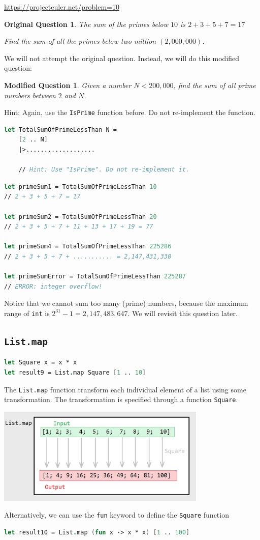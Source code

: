 \documentclass[12pt]{article}
\newtheorem*{modQuestion*}{Modified Question}
\newtheorem*{origQuestion*}{Original Question}
\begin{document}
\url{https://projecteuler.net/problem=10}

\begin{origQuestion*}
The sum of the primes below $10$ is $2 + 3 + 5 + 7 = 17$

Find the sum of all the primes below two million $(2,000,000)$.
\end{origQuestion*}
We will not attempt the original question. Instead, we will do this modified question:
\begin{modQuestion*}
Given a number $N < 200,000$, find the sum of all prime numbers between $2$ and $N$.
\end{modQuestion*}
Hint: Again, use the \texttt{IsPrime} function before. Do not re-implement the function.
\begin{lstlisting}[language=FSharp]
let TotalSumOfPrimeLessThan N =
    [2 .. N]
    |>...................
    
    // Hint: Use "IsPrime". Do not re-implement it.
\end{lstlisting}
\begin{lstlisting}[language=FSharp]
let primeSum1 = TotalSumOfPrimeLessThan 10
// 2 + 3 + 5 + 7 = 17

let primeSum2 = TotalSumOfPrimeLessThan 20
// 2 + 3 + 5 + 7 + 11 + 13 + 17 + 19 = 77

let primeSum4 = TotalSumOfPrimeLessThan 225286
// 2 + 3 + 5 + 7 + ........... = 2,147,431,330

let primeSumError = TotalSumOfPrimeLessThan 225287
// ERROR: integer overflow!
\end{lstlisting}
Notice that we cannot sum too many (prime) numbers, because the maximum range of \texttt{int} is $2^{31} - 1 = 2,147,483,647$. We will revisit this question later.
\pagebreak

\subsection{\texttt{List.map}}

\begin{lstlisting}[language=FSharp]
let Square x = x * x
let result9 = List.map Square [1 .. 10]
\end{lstlisting}
The \texttt{List.map} function transform each individual element of a list using some transformation. The transformation is specified through a function \texttt{Square}.
\begin{center}
\includegraphics[width=10cm]{pictures/picture28.png}
\end{center}   
Alternatively, we can use the \texttt{fun} keyword to define the \texttt{Square} function
\begin{lstlisting}[language=FSharp]
let result10 = List.map (fun x -> x * x) [1 .. 100]
\end{lstlisting}
\end{document}
